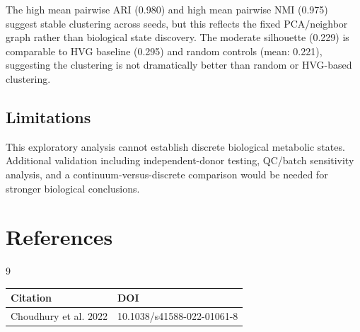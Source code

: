 \documentclass[11pt,a4paper]{article}
\begin{document}
The high mean pairwise ARI (0.980) and high mean pairwise NMI (0.975) suggest stable clustering across seeds, but this reflects the fixed PCA/neighbor graph rather than biological state discovery. The moderate silhouette (0.229) is comparable to HVG baseline (0.295) and random controls (mean: 0.221), suggesting the clustering is not dramatically better than random or HVG-based clustering.

\subsection{Limitations}
This exploratory analysis cannot establish discrete biological metabolic states. Additional validation including independent-donor testing, QC/batch sensitivity analysis, and a continuum-versus-discrete comparison would be needed for stronger biological conclusions.

\section{References}
\begin{thebibliography}{9}
\begin{tabular}{ll}
\toprule
\textbf{Citation} & \textbf{DOI} \\
\midrule
Choudhury et al. 2022 & 10.1038/s41588-022-01061-8 \\
\bottomrule
\end{tabular}
\end{thebibliography}
\end{document}
